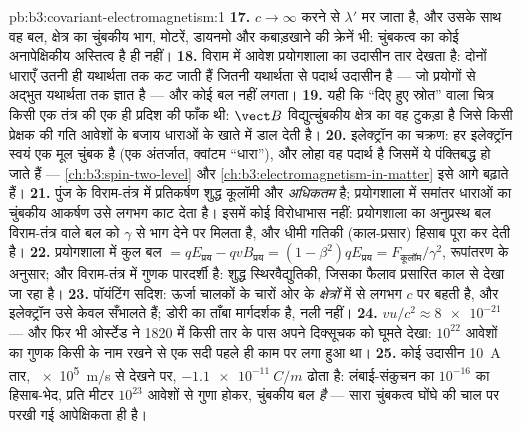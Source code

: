 \begin{solution}{pb:b3:covariant-electromagnetism:1}
\textbf{17.} $c \to \infty$ करने से $\lambda'$ मर जाता है, और उसके
साथ वह बल, क्षेत्र का चुंबकीय भाग, मोटरें, डायनमो और कबाड़खाने की
क्रेनें भी: चुंबकत्व का कोई अनापेक्षिकीय अस्तित्व है ही नहीं।
\textbf{18.} विराम में आवेश प्रयोगशाला का उदासीन तार देखता है: दोनों
धाराएँ उतनी ही यथार्थता तक कट जाती हैं जितनी यथार्थता से पदार्थ उदासीन
है --- जो प्रयोगों से अद्भुत यथार्थता तक ज्ञात है --- और कोई बल नहीं लगता।
\textbf{19.} यही कि ``दिए हुए स्रोत'' वाला चित्र किसी एक तंत्र की
एक ही प्रदिश की फाँक थी: $\vect B$ विद्युत्चुंबकीय क्षेत्र का वह
टुकड़ा है जिसे किसी प्रेक्षक की गति आवेशों के बजाय धाराओं के खाते में
डाल देती है।
\textbf{20.} इलेक्ट्रॉन का चक्रण: हर इलेक्ट्रॉन स्वयं एक मूल चुंबक है
(एक अंतर्जात, क्वांटम ``धारा''), और लोहा वह पदार्थ है जिसमें
ये पंक्तिबद्ध हो जाते हैं --- \cref{ch:b3:spin-two-level} और
\cref{ch:b3:electromagnetism-in-matter} इसे आगे बढ़ाते हैं।
\textbf{21.} पुंज के विराम-तंत्र में प्रतिकर्षण शुद्ध कूलॉमी और
\emph{अधिकतम} है; प्रयोगशाला में समांतर धाराओं का चुंबकीय आकर्षण उसे
लगभग काट देता है। इसमें कोई विरोधाभास नहीं: प्रयोगशाला का अनुप्रस्थ
बल विराम-तंत्र वाले बल को $\gamma$ से भाग देने पर मिलता है, और धीमी
गतिकी (काल-प्रसार) हिसाब पूरा कर देती है।
\textbf{22.} प्रयोगशाला में कुल बल $= qE_{\text{प्रय}} - qvB_{\text{प्रय}} =
(1 - \beta^2)qE_{\text{प्रय}} = F_{\text{कूलॉम}}/\gamma^2$, रूपांतरण के
अनुसार; और विराम-तंत्र में गुणक पारदर्शी है: शुद्ध स्थिरवैद्युतिकी,
जिसका फैलाव प्रसारित काल से देखा जा रहा है।
\textbf{23.} पॉयंटिंग सदिश: ऊर्जा चालकों के चारों ओर के
\emph{क्षेत्रों} में से लगभग $c$ पर बहती है, और इलेक्ट्रॉन उसे केवल
सँभालते हैं; डोरी का ताँबा मार्गदर्शक है, नली नहीं।
\textbf{24.} $vu/c^2 \approx \num{8e-21}$ --- और फिर भी ओर्स्टेड ने
1820 में किसी तार के पास अपने दिक्सूचक को घूमते देखा: $10^{22}$ आवेशों
का गुणक किसी के नाम रखने से एक सदी पहले ही काम पर लगा हुआ था।
\textbf{25.} कोई उदासीन \qty{10}{A} तार, \qty{e5}{m/s} से देखने पर,
$\qty{-1.1e-11}{C/m}$ ढोता है: लंबाई-संकुचन का $10^{-16}$ का
हिसाब-भेद, प्रति मीटर $10^{23}$ आवेशों से गुणा होकर,
चुंबकीय बल \emph{है} --- सारा चुंबकत्व घोंघे की चाल पर परखी गई
आपेक्षिकता ही है।
\end{solution}
